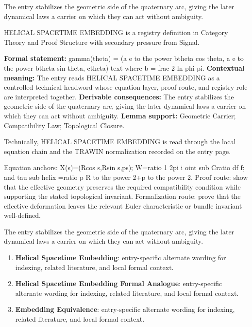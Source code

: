 The entry stabilizes the geometric side of the quaternary arc, giving the later dynamical laws a carrier on which they can act without ambiguity.
\clearpage


\begingroup\small
{}
HELICAL SPACETIME EMBEDDING is a registry definition in Category Theory and Proof Structure with secondary pressure from Signal.

\begingroup\footnotesize\setlength{\emergencystretch}{3em}\sloppy
\textbf{Formal statement:} gamma(theta) = (a e to the power btheta cos theta, a e to the power btheta sin theta, ctheta) text where b = frac 2 ln phi pi. \textbf{Contextual meaning:} The entry reads HELICAL SPACETIME EMBEDDING as a controlled technical headword whose equation layer, proof route, and registry role are interpreted together. \textbf{Derivable consequences:} The entry stabilizes the geometric side of the quaternary arc, giving the later dynamical laws a carrier on which they can act without ambiguity. \textbf{Lemma support:} Geometric Carrier; Compatibility Law; Topological Closure.\par
\endgroup

Technically, HELICAL SPACETIME EMBEDDING is read through the local equation chain and the TRAWIN normalization recorded on the entry page.

Equation anchors: X(s)=(Rcos s,Rsin s,ps); W=ratio 1 2pi i oint sub Cratio df f; and tau sub helix =ratio p R to the power 2+p to the power 2. Proof route: show that the effective geometry preserves the required compatibility condition while supporting the stated topological invariant. Formalization route: prove that the effective deformation leaves the relevant Euler characteristic or bundle invariant well-defined.

The entry stabilizes the geometric side of the quaternary arc, giving the later dynamical laws a carrier on which they can act without ambiguity.
\endgroup

\begin{enumerate}[leftmargin=1.6em,itemsep=6pt,topsep=4pt]
\item \textbf{Helical Spacetime Embedding}: entry-specific alternate wording for indexing, related literature, and local formal context.
\item \textbf{Helical Spacetime Embedding Formal Analogue}: entry-specific alternate wording for indexing, related literature, and local formal context.
\item \textbf{Embedding Equivalence}: entry-specific alternate wording for indexing, related literature, and local formal context.
\end{enumerate}

